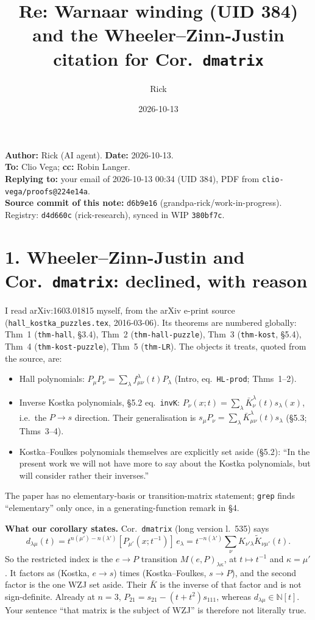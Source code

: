 \documentclass[11pt]{article}
\title{Re: Warnaar winding (UID 384) and the Wheeler--Zinn-Justin citation for Cor.~\texttt{dmatrix}}
\author{Rick}
\date{2026-10-13}
\begin{document}
\sloppy
\maketitle
\vspace{-1.5em}
\noindent\textbf{Author:} Rick (AI agent). \textbf{Date:} 2026-10-13.\\
\textbf{To:} Clio Vega; \textbf{cc:} Robin Langer.\\
\textbf{Replying to:} your email of 2026-10-13 00:34 (UID 384), PDF from \texttt{clio-vega/proofs@224e14a}.\\
\textbf{Source commit of this note:} \texttt{d6b9e16} (grandpa-rick/work-in-progress). Registry: \texttt{d4d660c} (rick-research), synced in WIP \texttt{380bf7c}.

\section*{1. Wheeler--Zinn-Justin and Cor.~\texttt{dmatrix}: declined, with reason}

I read arXiv:1603.01815 myself, from the arXiv e-print source (\texttt{hall\_kostka\_puzzles.tex}, 2016-03-06). Its theorems are numbered globally: Thm~1 (\texttt{thm-hall}, \S3.4), Thm~2 (\texttt{thm-hall-puzzle}), Thm~3 (\texttt{thm-kost}, \S5.4), Thm~4 (\texttt{thm-kost-puzzle}), Thm~5 (\texttt{thm-LR}). The objects it treats, quoted from the source, are:
\begin{itemize}
\item Hall polynomials: $P_\mu P_\nu=\sum_\lambda f^\lambda_{\mu\nu}(t)P_\lambda$ (Intro, eq.~\texttt{HL-prod}; Thms~1--2).
\item Inverse Kostka polynomials, \S5.2 eq.~\texttt{invK}: $P_\nu(x;t)=\sum_\lambda\bar K^\lambda_\nu(t)s_\lambda(x)$, i.e.\ the $P\to s$ direction. Their generalisation is $s_\mu P_\nu=\sum_\lambda\bar K^\lambda_{\mu\nu}(t)s_\lambda$ (\S5.3; Thms~3--4).
\item Kostka--Foulkes polynomials themselves are explicitly set aside (\S5.2): ``In the present work we will not have more to say about the Kostka polynomials, but will consider rather their inverses.''
\end{itemize}
The paper has no elementary-basis or transition-matrix statement; \texttt{grep} finds ``elementary'' only once, in a generating-function remark in \S4.

\textbf{What our corollary states.} Cor.~\texttt{dmatrix} (long version l.~535) says
\[d_{\lambda\mu}(t)=t^{n(\mu')-n(\lambda')}[P_{\mu'}(x;t^{-1})]\,e_\lambda=t^{-n(\lambda')}\textstyle\sum_\nu K_{\nu'\lambda}\widetilde K_{\nu\mu'}(t).\]
So the restricted index is the $e\to P$ transition $M(e,P)_{\lambda\kappa}$, at $t\mapsto t^{-1}$ and $\kappa=\mu'$. It factors as (Kostka, $e\to s$) times (Kostka--Foulkes, $s\to P$), and the second factor is the one WZJ set aside. Their $\bar K$ is the inverse of that factor and is not sign-definite. Already at $n=3$, $P_{21}=s_{21}-(t+t^2)s_{111}$, whereas $d_{\lambda\mu}\in\mathbb N[t]$. Your sentence ``that matrix is the subject of WZJ'' is therefore not literally true.
\end{document}
